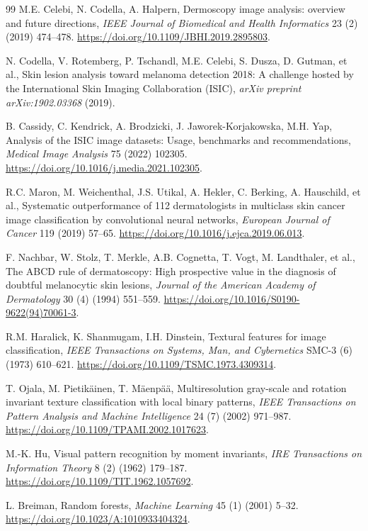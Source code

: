 \documentclass[11pt,a4paper]{article}
\begin{document}
\begin{thebibliography}{99}
M.E. Celebi, N. Codella, A. Halpern, Dermoscopy image analysis: overview and future directions, \textit{IEEE Journal of Biomedical and Health Informatics} 23 (2) (2019) 474--478. \url{https://doi.org/10.1109/JBHI.2019.2895803}.

N. Codella, V. Rotemberg, P. Tschandl, M.E. Celebi, S. Dusza, D. Gutman, et al., Skin lesion analysis toward melanoma detection 2018: A challenge hosted by the International Skin Imaging Collaboration (ISIC), \textit{arXiv preprint arXiv:1902.03368} (2019).

B. Cassidy, C. Kendrick, A. Brodzicki, J. Jaworek-Korjakowska, M.H. Yap, Analysis of the ISIC image datasets: Usage, benchmarks and recommendations, \textit{Medical Image Analysis} 75 (2022) 102305. \url{https://doi.org/10.1016/j.media.2021.102305}.

R.C. Maron, M. Weichenthal, J.S. Utikal, A. Hekler, C. Berking, A. Hauschild, et al., Systematic outperformance of 112 dermatologists in multiclass skin cancer image classification by convolutional neural networks, \textit{European Journal of Cancer} 119 (2019) 57--65. \url{https://doi.org/10.1016/j.ejca.2019.06.013}.

F. Nachbar, W. Stolz, T. Merkle, A.B. Cognetta, T. Vogt, M. Landthaler, et al., The ABCD rule of dermatoscopy: High prospective value in the diagnosis of doubtful melanocytic skin lesions, \textit{Journal of the American Academy of Dermatology} 30 (4) (1994) 551--559. \url{https://doi.org/10.1016/S0190-9622(94)70061-3}.

R.M. Haralick, K. Shanmugam, I.H. Dinstein, Textural features for image classification, \textit{IEEE Transactions on Systems, Man, and Cybernetics} SMC-3 (6) (1973) 610--621. \url{https://doi.org/10.1109/TSMC.1973.4309314}.

T. Ojala, M. Pietik{\"a}inen, T. M{\"a}enp{\"a}{\"a}, Multiresolution gray-scale and rotation invariant texture classification with local binary patterns, \textit{IEEE Transactions on Pattern Analysis and Machine Intelligence} 24 (7) (2002) 971--987. \url{https://doi.org/10.1109/TPAMI.2002.1017623}.

M.-K. Hu, Visual pattern recognition by moment invariants, \textit{IRE Transactions on Information Theory} 8 (2) (1962) 179--187. \url{https://doi.org/10.1109/TIT.1962.1057692}.

L. Breiman, Random forests, \textit{Machine Learning} 45 (1) (2001) 5--32. \url{https://doi.org/10.1023/A:1010933404324}.


\end{thebibliography}
\end{document}
